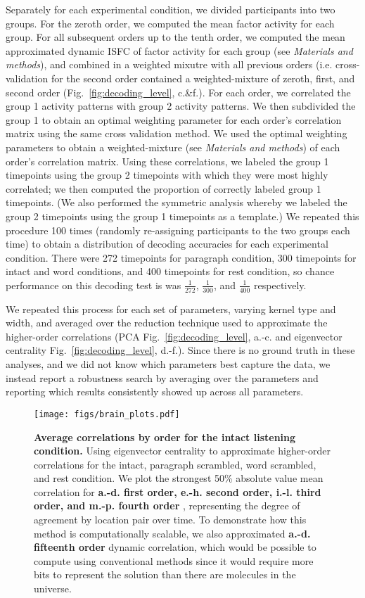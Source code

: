 Separately for each experimental condition, we divided participants
into two groups. For the zeroth order, we computed the mean factor
activity for each group.  For all subsequent orders up to the tenth
order, we computed the mean approximated dynamic ISFC of factor
activity for each group (see \textit{Materials and methods}), and
combined in a weighted mixutre with all previous orders
(i.e. cross-validation for the second
order contained a weighted-mixture of zeroth, first, and second order
(Fig.~\ref{fig:decoding_level}, c.\&f.).  For
each order, we correlated the group 1 activity patterns with group 2
activity patterns.  We then subdivided the group 1 to obtain an
optimal weighting parameter for each order’s correlation matrix using
the same cross validation method. We used the optimal weighting
parameters to obtain a weighted-mixture (see \textit{Materials and methods}) of each order’s correlation
matrix. Using these correlations, we labeled the group 1 timepoints
using the group 2 timepoints with which they were most highly
correlated; we then computed the proportion of correctly labeled group
1 timepoints. (We also performed the symmetric analysis whereby we
labeled the group 2 timepoints using the group 1 timepoints as a
template.) We repeated this procedure 100 times (randomly re-assigning
participants to the two groups each time) to obtain a distribution of
decoding accuracies for each experimental condition. There were 272
timepoints for paragraph condition, 300 timepoints for intact and word
conditions, and 400 timepoints for rest condition,  so chance
performance on this decoding test is was $\frac{1}{272}$,
$\frac{1}{300}$, and $\frac{1}{400}$ respectively.
 
We repeated this process for each set of parameters, varying kernel
type and width, and averaged over the reduction technique used to
approximate the higher-order correlations (PCA Fig.~\ref{fig:decoding_level},  a.-c. and eigenvector
centrality Fig.~\ref{fig:decoding_level},  d.-f.).  Since there is no ground truth in these analyses, and we did not know
which parameters best capture the data, we instead report a robustness
search by averaging over the parameters and reporting which results
consistently showed up across all parameters.
\begin{figure}
  \centering
  \texttt{[image: figs/brain\_plots.pdf]}
  \caption{\textbf{Average correlations by order for the intact listening condition.} Using eigenvector
    centrality to approximate higher-order correlations for the
    intact, paragraph scrambled, word scrambled, and rest condition.
    We plot the
    strongest 50\% absolute value
    mean correlation for \textbf{a.-d. first order, e.-h. second order,
      i.-l. third order, and m.-p. fourth order }, representing the degree of agreement by
    location pair over time.  To demonstrate how this method is
    computationally scalable, we also approximated
    \textbf{a.-d. fifteenth order} dynamic correlation, which would be
    possible to compute using conventional methods since it would require more bits to represent the solution than there are molecules in the universe.}
  \label{fig:brain_plots}
\end{figure}

